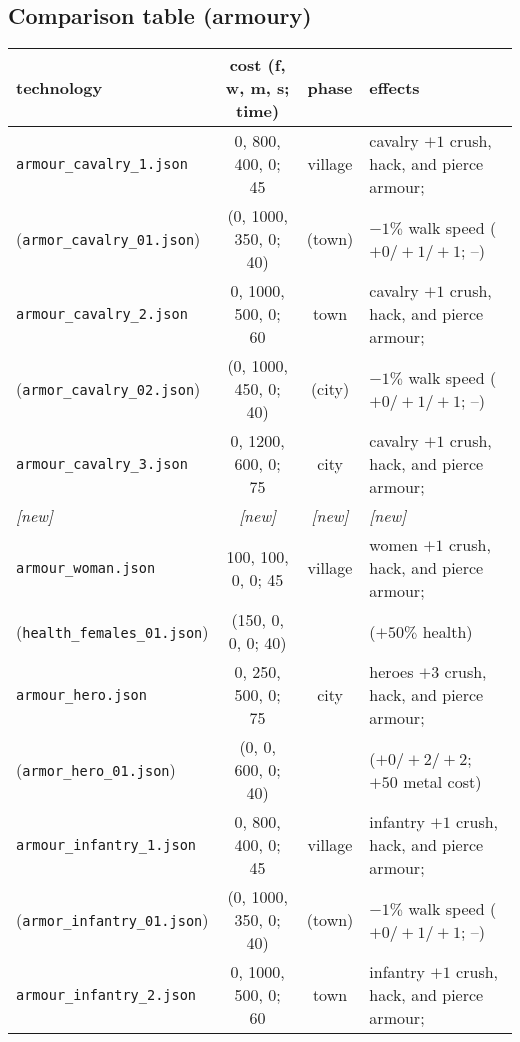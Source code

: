 \documentclass{article}
\begin{document}
\subsection{Comparison table (armoury)}
\begin{tabular}{l|cc|l}
{\bf technology} & {{\bf cost} (f, w, m, s; time)} & {\bf phase} & {\bf effects} \\
\hline
\verb+armour_cavalry_1.json+                 &     0,  800,  400,    0;  45  & village    & cavalry $+1$ crush, hack, and pierce armour; \\
(\verb+armor_cavalry_01.json+)               &    (0, 1000,  350,    0;  40) & (town)     & $-1\%$ walk speed ($+0/+1/+1$; --) \\
\hline
\verb+armour_cavalry_2.json+                 &     0, 1000,  500,    0;  60  & town       & cavalry $+1$ crush, hack, and pierce armour; \\
(\verb+armor_cavalry_02.json+)               &    (0, 1000,  450,    0;  40) & (city)     & $-1\%$ walk speed ($+0/+1/+1$; --) \\
\hline
\verb+armour_cavalry_3.json+                 &     0, 1200,  600,    0;  75  & city       & cavalry $+1$ crush, hack, and pierce armour; \\
\emph{[new]} & \emph{[new]} & \emph{[new]} & \emph{[new]} \\
\hline
\verb+armour_woman.json+                    &   100,  100,    0,    0;  45  & village    & women $+1$ crush, hack, and pierce armour; \\
(\verb+health_females_01.json+)              &  (150,    0,    0,    0;  40) &            & ($+50\%$ health) \\
\hline
\verb+armour_hero.json+                      &     0,  250,  500,    0;  75  & city       & heroes $+3$ crush, hack, and pierce armour; \\ %
(\verb+armor_hero_01.json+)                  &    (0,    0,  600,    0;  40) &            & ($+0/+2/+2$; $+50$ metal cost) \\
\hline
\verb+armour_infantry_1.json+                &     0,  800,  400,    0;  45  & village    & infantry $+1$ crush, hack, and pierce armour; \\
(\verb+armor_infantry_01.json+)              &    (0, 1000,  350,    0;  40) & (town)     & $-1\%$ walk speed ($+0/+1/+1$; --) \\
\hline
\verb+armour_infantry_2.json+                &     0, 1000,  500,    0;  60  & town       & infantry $+1$ crush, hack, and pierce armour; \\

\end{tabular}
\end{document}
